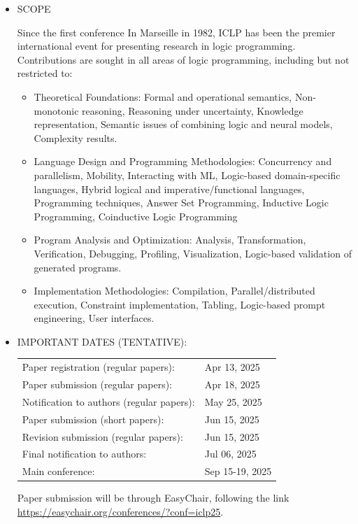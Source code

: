 \documentclass[prodmode,acmtecs]{acmsmall} %
\begin{document}
\begin{itemize}\item  SCOPE 
 
  Since the first conference In Marseille in 1982, ICLP has been the premier international event for presenting research in logic programming. Contributions are sought in all areas of logic programming, including but not restricted to:  
 
\begin{itemize}\item  Theoretical Foundations: Formal and operational semantics, Non-monotonic reasoning, Reasoning under uncertainty, Knowledge representation, Semantic issues of combining logic and neural models, Complexity results.
\item  Language Design and Programming Methodologies: Concurrency and parallelism, Mobility, Interacting with ML, Logic-based domain-specific languages, Hybrid logical and imperative/functional languages, Programming techniques, Answer Set Programming, Inductive Logic Programming, Coinductive Logic Programming
\item  Program Analysis and Optimization: Analysis, Transformation, Verification, Debugging, Profiling, Visualization, Logic-based validation of generated programs.
\item  Implementation Methodologies: Compilation, Parallel/distributed execution, Constraint implementation, Tabling, Logic-based prompt engineering, User interfaces.
\end{itemize} 
\item  IMPORTANT DATES (TENTATIVE): 
 
\begin{tabulary}{\linewidth}{LL}Paper registration (regular papers):  & Apr 13, 2025 \\
Paper submission (regular papers):  & Apr 18, 2025 \\
Notification to authors (regular papers):  & May 25, 2025 \\
Paper submission (short papers):  & Jun 15, 2025 \\
Revision submission (regular papers):  & Jun 15, 2025 \\
Final notification to authors:  & Jul 06, 2025 \\
Main conference:  & Sep 15-19, 2025 \\
\end{tabulary}
 
  Paper submission will be through EasyChair, following the link \href{https://easychair.org/conferences/?conf=iclp25}{https://easychair.org/conferences/?conf=iclp25}.   
 

\end{itemize}
\end{document}
